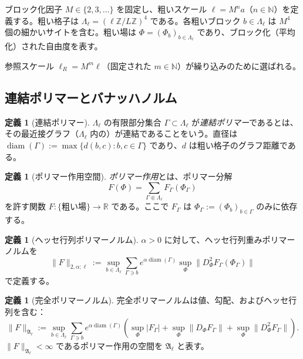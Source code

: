 \documentclass[12pt]{article}
\theoremstyle{plain}
\theoremstyle{definition}
\newtheorem{definition}[theorem]{定義}
\numberwithin{equation}{section}
\newcommand{\R}{\mathbb{R}}
\newcommand{\Z}{\mathbb{Z}}
\newcommand{\N}{\mathbb{N}}
\newcommand{\fA}{\mathfrak{A}}
\newcommand{\diam}{\operatorname{diam}}
\begin{document}
ブロック化因子 $M\in\{2,3,\ldots\}$ を固定し、粗いスケール $\ell=M^n a$（$n\in\N$）を定義する。粗い格子は $\Lambda_\ell=(\ell\Z/L\Z)^4$ である。各粗いブロック $b\in\Lambda_\ell$ は $M^4$ 個の細かいサイトを含む。粗い場は $\Phi=(\Phi_b)_{b\in\Lambda_\ell}$ であり、ブロック化（平均化）された自由度を表す。

参照スケール $\ell_R=M^m\ell$（固定された $m\in\N$）が繰り込みのために選ばれる。

\subsection{連結ポリマーとバナッハノルム}

\begin{definition}[連結ポリマー]
$\Lambda_\ell$ の有限部分集合 $\Gamma\subset\Lambda_\ell$ が\emph{連結ポリマー}であるとは、その最近接グラフ（$\Lambda_\ell$ 内の）が連結であることをいう。直径は $\diam(\Gamma):=\max\{d(b,c):b,c\in\Gamma\}$ であり、$d$ は粗い格子のグラフ距離である。
\end{definition}

\begin{definition}[ポリマー作用空間]
\emph{ポリマー作用}とは、ポリマー分解
\begin{equation}
F(\Phi) = \sum_{\Gamma\Subset\Lambda_\ell}F_\Gamma(\Phi_\Gamma)
\end{equation}
を許す関数 $F:\{\text{粗い場}\}\to\R$ である。ここで $F_\Gamma$ は $\Phi_\Gamma:=(\Phi_b)_{b\in\Gamma}$ のみに依存する。
\end{definition}

\begin{definition}[ヘッセ行列ポリマーノルム]
$\alpha>0$ に対して、ヘッセ行列重みポリマーノルムを
\begin{equation}
\|F\|_{2,\alpha;\ell} := \sup_{b\in\Lambda_\ell}\sum_{\Gamma\ni b}e^{\alpha\diam(\Gamma)}\sup_\Phi\|D_\Phi^2 F_\Gamma(\Phi_\Gamma)\|
\end{equation}
で定義する。
\end{definition}

\begin{definition}[完全ポリマーノルム]
完全ポリマーノルムは値、勾配、およびヘッセ行列を含む：
\begin{equation}
\|F\|_{\fA_\ell} := \sup_{b\in\Lambda_\ell}\sum_{\Gamma\ni b}e^{\alpha\diam(\Gamma)}\left(\sup_\Phi|F_\Gamma|+\sup_\Phi\|D_\Phi F_\Gamma\|+\sup_\Phi\|D_\Phi^2 F_\Gamma\|\right).
\end{equation}
$\|F\|_{\fA_\ell}<\infty$ であるポリマー作用の空間を $\fA_\ell$ と表す。
\end{definition}
\end{document}
